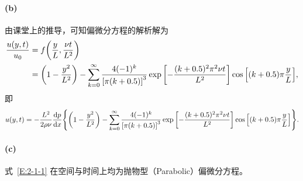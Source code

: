 \paragraph{(b)}
由课堂上的推导，可知偏微分方程的解析解为
\begin{equation*}
    \begin{aligned}
        \frac{u(y, t)}{u_0} &= f\qty(\frac{y}{L}, \frac{\nu t}{L^2}) \\
                            &= \qty(1 - \frac{y^2}{L^2}) - \sum_{k=0}^\infty\frac{4(-1)^k}{\qty[\pi(k+0.5)]^3}\exp\qty[-\frac{(k+0.5)^2\pi^2\nu t}{L^2}]\cos\qty[(k+0.5)\pi\frac{y}{L}],
    \end{aligned}
\end{equation*}
即
\begin{equation*}
    u(y, t) = -\frac{L^2}{2\rho\nu}\dv{p}{x} \qty{
        \qty(1 - \frac{y^2}{L^2}) - \sum_{k=0}^\infty\frac{4(-1)^k}{\qty[\pi(k+0.5)]^3}\exp\qty[-\frac{(k+0.5)^2\pi^2\nu t}{L^2}]\cos\qty[(k+0.5)\pi\frac{y}{L}]
    }.
\end{equation*}

\paragraph{(c)}
式~\eqref{E:2-1-1} 在空间与时间上均为抛物型（Parabolic）偏微分方程。



